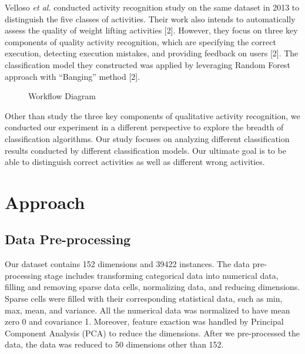 \documentclass{article} %
\begin{document}
Velloso \textit{et al.} conducted activity recognition study on the same dataset in 2013 to distinguish the five classes of activities. Their work also intends to automatically assess the quality of weight lifting activities [2]. However, they focus on three key components of quality activity recognition, which are specifying the correct execution, detecting execution mistakes, and providing feedback on users [2]. The classification model they constructed was applied by leveraging Random Forest approach with  “Banging” method [2].

\begin{figure}[hbt]
\begin{center}
\end{center}
\caption{Workflow Diagram}
\end{figure}

Other than study the three key components of qualitative activity recognition, we conducted our experiment in a different perspective to explore the breadth of classification algorithms. Our study focuses on analyzing different classification results conducted by different classification models. Our ultimate goal is to be able to distinguish correct activities as well as different wrong activities.

\section{Approach}

\subsection{Data Pre-processing}

Our dataset contains 152 dimensions and 39422 instances. The data pre-processing stage includes transforming categorical data into numerical data, filling and removing sparse data cells, normalizing data, and reducing dimensions. Sparse cells were filled with their corresponding statistical data, such as min, max, mean, and variance. All the numerical data was normalized to have mean zero 0 and covariance 1. Moreover, feature exaction was handled by Principal Component Analysis (PCA) to reduce the dimensions. After we pre-processed the data, the data was reduced to 50 dimensions other than 152.
\end{document}
